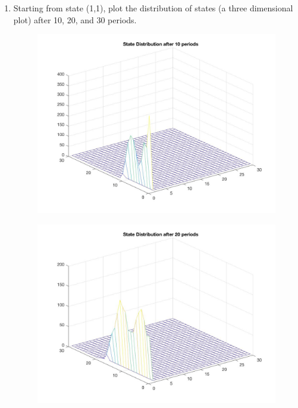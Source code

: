 \documentclass[11pt]{article}
\begin{document}
\begin{enumerate}
\item Starting from state (1,1), plot the distribution of states (a three dimensional plot) after 10, 20, and 30 periods.  \\[2em]
\begin{figure}
\centering
\includegraphics[scale=0.4]{fig3.jpg}
\end{figure}
\begin{figure}
\centering
\includegraphics[scale=0.4]{fig4.jpg}
\end{figure}
\begin{figure}
\centering

\end{figure}
\end{enumerate}
\end{document}
